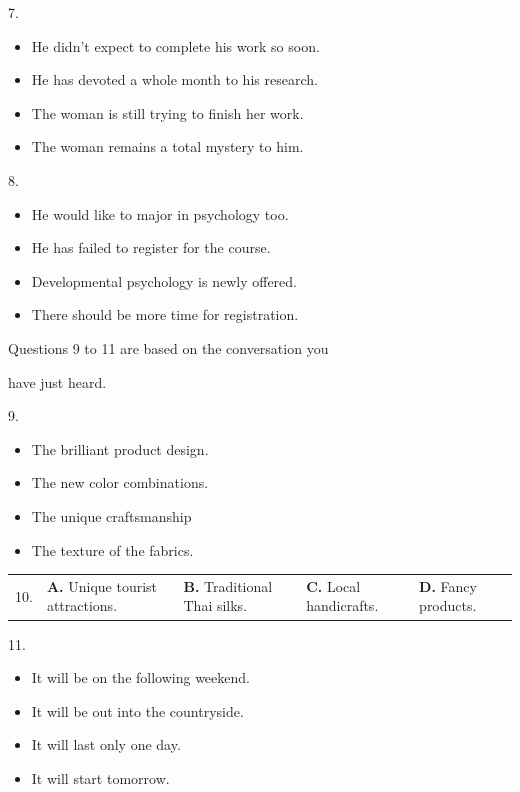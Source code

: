 \documentclass[UTF8,11pt]{ctexart}
\begin{document}
7.


\begin{itemize}[leftmargin=2em,itemsep=.2em,topsep=.4em]\item[A.] He didn’t expect to complete his work so soon.
\item[B.] He has devoted a whole month to his research.
\item[C.] The woman is still trying to finish her work.
\item[D.] The woman remains a total mystery to him.
\end{itemize}

8.


\begin{itemize}[leftmargin=2em,itemsep=.2em,topsep=.4em]\item[A.] He would like to major in psychology too.
\end{itemize}

\begin{itemize}[leftmargin=2em,itemsep=.2em,topsep=.4em]\item[B.] He has failed to register for the course.
\item[C.] Developmental psychology is newly offered.
\item[D.] There should be more time for registration.
\end{itemize}

Questions 9 to 11 are based on the conversation you


have just heard.


9.


\begin{itemize}[leftmargin=2em,itemsep=.2em,topsep=.4em]\item[A.] The brilliant product design.
\item[B.] The new color combinations.
\item[C.] The unique craftsmanship
\item[D.] The texture of the fabrics.
\end{itemize}

\noindent\begin{tabularx}{\linewidth}{@{}lXXXX@{}}10. & \textbf{A.} Unique tourist attractions. & \textbf{B.} Traditional Thai silks. & \textbf{C.} Local handicrafts. & \textbf{D.} Fancy products.\\\end{tabularx}\par

11.


\begin{itemize}[leftmargin=2em,itemsep=.2em,topsep=.4em]\item[A.] It will be on the following weekend.
\item[B.] It will be out into the countryside.
\item[C.] It will last only one day.
\item[D.] It will start tomorrow.
\end{itemize}
\end{document}
